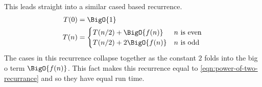 \documentclass[./Thesis.tex]{subfiles}
\begin{document}
This leads straight into a similar cased based recurrence.
\begin{align}
  \label{eqn:squaring-recurrance}
  \begin{split}
    T(0) &= \BigO{1} \\
    T(n) &=
    \begin{cases}
      T(n / 2) + \BigO{f(n)} & n \text{ is even} \\
      T(n / 2) + 2 \BigO{f(n)} & n \text{ is odd} \\
  \end{cases}
  \end{split}
\end{align}
The cases in this recurrence collapse together as the constant $2$ folds into
the big o term $\BigO{f(n)}$. This fact makes this recurrence equal to
\ref{eqn:power-of-two-recurrance} and so they have equal run time.
\end{document}
